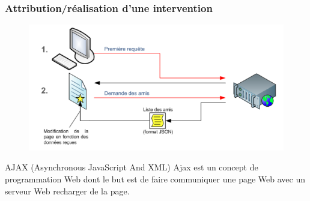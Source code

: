 \begin{frame}
\frametitle{Attribution/réalisation d'une intervention}
      \begin{figure}[r]
		\includegraphics[scale=0.35]{images/ajax.png}
	  \end{figure}
      \begin{block}{AJAX (Asynchronous JavaScript And XML)}
		Ajax est un concept de programmation Web dont le but est de faire communiquer une page Web avec un serveur Web recharger de la page.
	  \end{block}
\end{frame}
